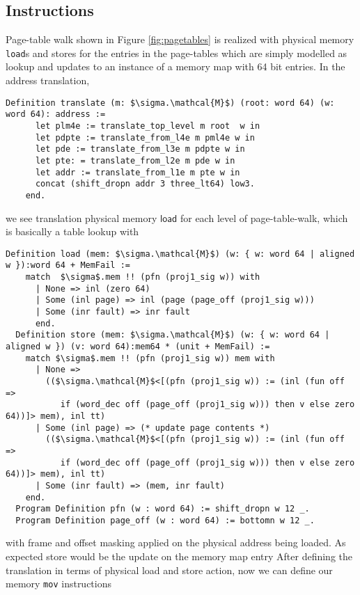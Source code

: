 \subsection{Instructions}
\label{sec:instructions}
Page-table walk shown in Figure \ref{fig:pagetables} is realized with physical memory \texttt{load}s and \textsf{store}s for the entries in the page-tables which are simply modelled as lookup and updates to an instance of a memory map with 64 bit entries. In the address translation,
\begin{lstlisting}[language=Coq]
 Definition translate (m: $\sigma.\mathcal{M}$) (root: word 64) (w: word 64): address :=
      let plm4e := translate_top_level m root  w in
      let pdpte := translate_from_l4e m pml4e w in 
      let pde := translate_from_l3e m pdpte w in
      let pte: = translate_from_l2e m pde w in
      let addr := translate_from_l1e m pte w in
      concat (shift_dropn addr 3 three_lt64) low3.
    end.
\end{lstlisting}
we see translation physical memory $\mathsf{load}$ for each level of page-table-walk, which is basically a table lookup with
\begin{lstlisting}[language=Coq]
   Definition load (mem: $\sigma.\mathcal{M}$) (w: { w: word 64 | aligned w }):word 64 + MemFail :=
    match  $\sigma$.mem !! (pfn (proj1_sig w)) with
      | None => inl (zero 64)
      | Some (inl page) => inl (page (page_off (proj1_sig w)))
      | Some (inr fault) => inr fault
      end.
  Definition store (mem: $\sigma.\mathcal{M}$) (w: { w: word 64 | aligned w }) (v: word 64):mem64 * (unit + MemFail) :=
    match $\sigma$.mem !! (pfn (proj1_sig w)) mem with
      | None =>
        (($\sigma.\mathcal{M}$<[(pfn (proj1_sig w)) := (inl (fun off =>
           if (word_dec off (page_off (proj1_sig w))) then v else zero 64))]> mem), inl tt)
      | Some (inl page) => (* update page contents *)
        (($\sigma.\mathcal{M}$<[(pfn (proj1_sig w)) := (inl (fun off =>
           if (word_dec off (page_off (proj1_sig w))) then v else zero 64))]> mem), inl tt)
      | Some (inr fault) => (mem, inr fault)
    end.
  Program Definition pfn (w : word 64) := shift_dropn w 12 _.
  Program Definition page_off (w : word 64) := bottomn w 12 _.
\end{lstlisting}
with frame and offset masking applied on the physical address being loaded. As expected \textsf{store} would be the update on the memory map entry
After defining the translation in terms of physical load and store action, now we can define our memory \lstinline|mov| instructions
